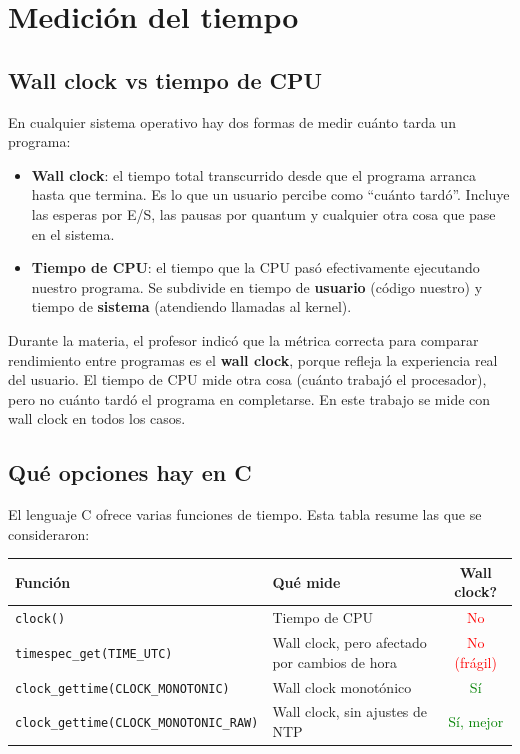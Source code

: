 \section{Medición del tiempo}

\subsection{Wall clock vs tiempo de CPU}

En cualquier sistema operativo hay dos formas de medir cuánto tarda un programa:

\begin{itemize}
    \item \textbf{Wall clock}: el tiempo total transcurrido desde que el programa arranca hasta que termina. Es lo que un usuario percibe como ``cuánto tardó''. Incluye las esperas por E/S, las pausas por quantum y cualquier otra cosa que pase en el sistema.
    \item \textbf{Tiempo de CPU}: el tiempo que la CPU pasó efectivamente ejecutando nuestro programa. Se subdivide en tiempo de \textbf{usuario} (código nuestro) y tiempo de \textbf{sistema} (atendiendo llamadas al kernel).
\end{itemize}

Durante la materia, el profesor indicó que la métrica correcta para comparar rendimiento entre programas es el \textbf{wall clock}, porque refleja la experiencia real del usuario. El tiempo de CPU mide otra cosa (cuánto trabajó el procesador), pero no cuánto tardó el programa en completarse. En este trabajo se mide con wall clock en todos los casos.

\subsection{Qué opciones hay en C}

El lenguaje C ofrece varias funciones de tiempo. Esta tabla resume las que se consideraron:

\begin{center}
\scriptsize
\begin{tabular}{|l|l|c|}
\hline
\textbf{Función} & \textbf{Qué mide} & \textbf{Wall clock?} \\
\hline
\texttt{clock()} & Tiempo de CPU & \textcolor{red}{No} \\
\texttt{timespec\_get}\newline\texttt{(TIME\_UTC)} & Wall clock, pero afectado por cambios de hora & \textcolor{red}{No (frágil)} \\
\texttt{clock\_gettime}\newline\texttt{(CLOCK\_MONOTONIC)} & Wall clock monotónico & \textcolor{green}{Sí} \\
\texttt{clock\_gettime}\newline\texttt{(CLOCK\_MONOTONIC\_RAW)} & Wall clock, sin ajustes de NTP & \textcolor{green}{Sí, mejor} \\
\hline
\end{tabular}
\end{center}

